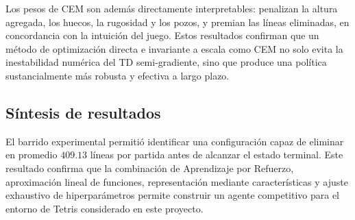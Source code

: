Los pesos de CEM son además directamente interpretables: penalizan la altura agregada, los huecos, la rugosidad y los pozos, y premian las líneas eliminadas, en concordancia con la intuición del juego. Estos resultados confirman que un método de optimización directa e invariante a escala como CEM no solo evita la inestabilidad numérica del TD semi-gradiente, sino que produce una política sustancialmente más robusta y efectiva a largo plazo.

\subsection{Síntesis de resultados}

El barrido experimental permitió identificar una configuración capaz de eliminar en promedio $409.13$ líneas por partida antes de alcanzar el estado terminal. Este resultado confirma que la combinación de Aprendizaje por Refuerzo, aproximación lineal de funciones, representación mediante características y ajuste exhaustivo de hiperparámetros permite construir un agente competitivo para el entorno de Tetris considerado en este proyecto.
